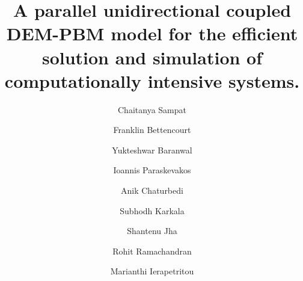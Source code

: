 \documentclass[preprint,11pt,authoryear]{elsarticle}
\newcommand{\jhanote}[1]{ {\textcolor{red} { ***shantenu: #1 }}}
\newcommand{\csnote}[1]{ {\textcolor{blue} { ***chaitanya: #1 }}}
\newcommand{\jhanote}[1]{ {\textcolor{red} { ***shantenu: #1 }}}
\newcommand{\csnote}[1]{}
\begin{document}
\begin{frontmatter}

\title{A parallel unidirectional coupled DEM-PBM model for the efficient solution and simulation of 
computationally  intensive systems.}
\author[add1]{Chaitanya Sampat}
\author[add1]{Franklin Bettencourt}
\author[add1]{Yukteshwar Baranwal}
\author[add2]{Ioannis Paraskevakos}
\author[add1]{Anik Chaturbedi}
\author[add1]{Subhodh Karkala}
\author[add2]{Shantenu Jha}
\author[add1]{Rohit Ramachandran}
\author[add1]{Marianthi Ierapetritou}
\address[add1]{Department of Chemical and Biochemical Engineering, Rutgers, The State University of New
Jersey, Piscataway, NJ, USA-08854}
\address[add2]{Electrical and Computer Engineering, Rutgers, The State University of New Jersey, 
Piscataway, NJ, USA-08854}




\end{frontmatter}
\end{document}
